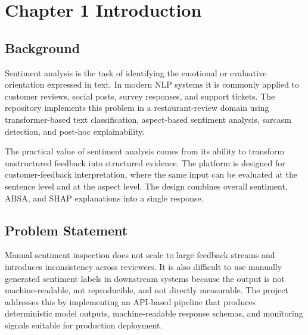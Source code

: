 \documentclass[12pt, a4paper]{article}
\begin{document}
\newpage
\tableofcontents
\newpage

\section{Chapter 1 Introduction}

\subsection{Background}
Sentiment analysis is the task of identifying the emotional or evaluative orientation expressed in text. In modern NLP systems it is commonly applied to customer reviews, social posts, survey responses, and support tickets. The repository implements this problem in a restaurant-review domain using transformer-based text classification, aspect-based sentiment analysis, sarcasm detection, and post-hoc explainability.

The practical value of sentiment analysis comes from its ability to transform unstructured feedback into structured evidence. The platform is designed for customer-feedback interpretation, where the same input can be evaluated at the sentence level and at the aspect level. The design combines overall sentiment, ABSA, and SHAP explanations into a single response.

\subsection{Problem Statement}
Manual sentiment inspection does not scale to large feedback streams and introduces inconsistency across reviewers. It is also difficult to use manually generated sentiment labels in downstream systems because the output is not machine-readable, not reproducible, and not directly measurable. The project addresses this by implementing an API-based pipeline that produces deterministic model outputs, machine-readable response schemas, and monitoring signals suitable for production deployment.
\end{document}
